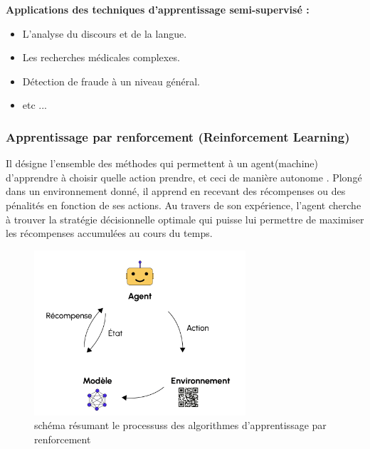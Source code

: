 \textbf{Applications des techniques d'apprentissage semi-supervisé \cite{what_is_machine_learning}:}
\begin{itemize}[label={*}]
\item L'analyse du discours et de la langue.
\item Les recherches médicales complexes.
\item Détection de fraude à un niveau général.
\item etc ...
\end{itemize}

\vspace{2cm}


\subsubsection{Apprentissage par renforcement (Reinforcement Learning)}
Il désigne l’ensemble des méthodes qui permettent à un agent(machine) d’apprendre à choisir quelle action prendre, et ceci de manière autonome .
Plongé dans un environnement donné, il apprend en recevant des récompenses ou des pénalités en fonction de ses actions. Au travers de son expérience, l’agent cherche à trouver la stratégie décisionnelle optimale qui puisse lui permettre de maximiser les récompenses accumulées au cours du temps.

     \begin{figure}[htbp]
     \centering    
     \includegraphics[width=0.7\textwidth,height=0.3\textheight]{img/reinforcement_learning.png}
     \caption{schéma résumant le processuss des algorithmes d'apprentissage par renforcement \cite{reinforcement_learning}}
     \label{fig:example8}
     \end{figure}

